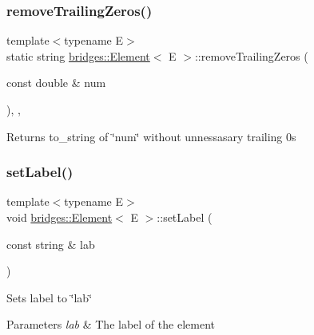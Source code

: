 \subsubsection{\texorpdfstring{remove\+Trailing\+Zeros()}{removeTrailingZeros()}}
{\footnotesize\ttfamily template$<$typename E$>$ \\
static string \mbox{\hyperlink{classbridges_1_1_element}{bridges\+::\+Element}}$<$ E $>$\+::remove\+Trailing\+Zeros (\begin{DoxyParamCaption}\item[{const double \&}]{num }\end{DoxyParamCaption})\hspace{0.3cm}{\ttfamily [inline]}, {\ttfamily [static]}, {\ttfamily [protected]}}

\begin{DoxyReturn}{Returns}
to\+\_\+string of \char`\"{}num\char`\"{} without unnessasary trailing 0s 
\end{DoxyReturn}
\mbox{\label{classbridges_1_1_element_a22313b74452175d07650168a701daa99}} 
\subsubsection{\texorpdfstring{set\+Label()}{setLabel()}}
{\footnotesize\ttfamily template$<$typename E$>$ \\
void \mbox{\hyperlink{classbridges_1_1_element}{bridges\+::\+Element}}$<$ E $>$\+::set\+Label (\begin{DoxyParamCaption}\item[{const string \&}]{lab }\end{DoxyParamCaption})\hspace{0.3cm}{\ttfamily [inline]}}

Sets label to \char`\"{}lab\char`\"{}


\begin{DoxyParams}{Parameters}
{\em lab} & The label of the element \\
\hline
\end{DoxyParams}
\mbox{\label{classbridges_1_1_element_a737cb19281b6aa45a5a1dc9d592dad93}} 
